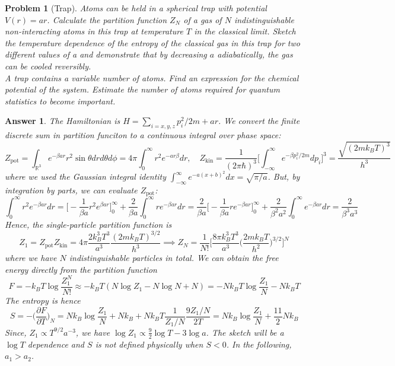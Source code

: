 \documentclass[a4paper]{article}
\theoremstyle{new2}
\newtheorem{ans}{Answer}[section]
\theoremstyle{new}
\newtheorem{qns}{Problem}[section]
\begin{document}
\begin{qns}[Trap]
Atoms can be held in a spherical trap with potential $V (r) = ar$. Calculate the partition function $Z_N$ of a gas of $N$ indistinguishable non-interacting atoms in this trap at temperature $T$ in the classical limit. Sketch the temperature dependence of the entropy of the classical gas in this trap for two different values of a and demonstrate that by decreasing $a$ adiabatically, the gas can be cooled reversibly. \\[5pt]
A trap contains a variable number of atoms. Find an expression for the chemical potential of the system. Estimate the number of atoms required for quantum statistics to become important.
\end{qns}
\begin{ans}
The Hamiltonian is $H=\sum_{i=x,y,z}p_i^2/2m+ar$. We convert the finite discrete sum in partition funciton to a continuous integral over phase space:
$$Z_{\text{pot}}=\int_{\mathbb{R}^3}e^{-\beta ar}r^2\sin\theta drd\theta d\phi=4\pi\int_0^\infty r^2e^{-ar\beta}dr,\quad Z_{\text{kin}}=\frac{1}{(2\pi\hbar)^3}\bigg[\int_{-\infty}^\infty e^{-\beta p_i^2/2m}dp_i\bigg]^3=\frac{\sqrt{(2mk_BT)^3}}{h^3}$$
where we used the Gaussian integral identity $\int_{-\infty}^\infty e^{-a(x+b)^2}dx=\sqrt{\pi/a}$. But, by integration by parts, we can evaluate $Z_{\text{pot}}$:
$$\int_0^\infty r^2e^{-\beta ar}dr=\bigg[-\frac{1}{\beta a}r^2e^{\beta ar}\bigg]_0^\infty+\frac{2}{\beta a}\int_0^\infty re^{-\beta ar}dr=\frac{2}{\beta a}\bigg[-\frac{1}{\beta a}re^{-\beta ar}\bigg]_0^\infty+\frac{2}{\beta^2a^2}\int_0^\infty e^{-\beta ar}dr=\frac{2}{\beta^3a^3}$$
Hence, the single-particle partition function is
$$Z_1=Z_{\text{pot}}Z_{\text{kin}}=4\pi\frac{2k_B^3T^3}{a^3}\frac{(2mk_BT)^{3/2}}{h^3}\implies Z_N=\frac{1}{N!}\bigg[\frac{8\pi k_B^3T^3}{a^3}\bigg(\frac{2mk_BT}{h^2}\bigg)^{3/2}\bigg]^N$$
where we have $N$ indistinguishable particles in total. We can obtain the free energy directly from the partition function
$$F=-k_BT\log\frac{Z_1^N}{N!}\approx -k_BT(N\log Z_1-N\log N+N)=-Nk_BT\log\frac{Z_1}{N}-Nk_BT$$
The entropy is hence
$$S=-\bigg(\frac{\partial F}{\partial T}\bigg)_N=Nk_B\log\frac{Z_1}{N}+Nk_B+Nk_BT\frac{1}{Z_1/N}\frac{9Z_1/N}{2T}=Nk_B\log\frac{Z_1}{N}+\frac{11}{2}Nk_B$$
Since, $Z_1\propto T^{9/2}a^{-3}$, we have $\log Z_1\propto\frac{9}{2}\log T-3\log a$. The sketch will be a $\log T$ dependence and $S$ is not defined physically when $S<0$. In the following, $a_1>a_2$.
\begin{center}
\begin{tikzpicture}

\end{tikzpicture}
\end{center}
\end{ans}
\end{document}
